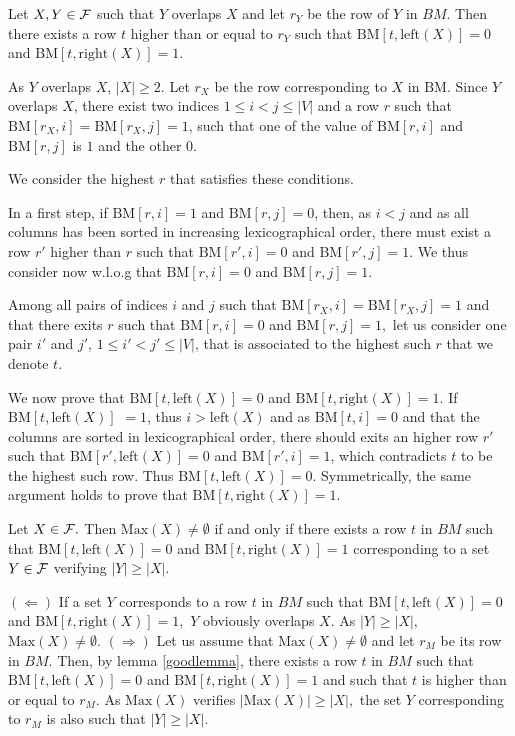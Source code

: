 \documentclass{llncs}
\begin{document}
\begin{lemma}
 Let $X,Y\in {\cal F}$ such that $Y$ overlaps $X$ and let $r_Y$ be the
 row of $Y$ in $BM$. Then there exists a row $t$ higher than or equal
 to $r_Y$ such that $\mbox{BM}[t,\mbox{left}(X)]=0$ and
 $\mbox{BM}[t,\mbox{right}(X)]=1.$
\label{goodlemma}
\end{lemma}
\begin{preuve}
 As $Y$ overlaps $X$, $|X|\geq 2.$ Let $r_X$ be the row
 corresponding to $X$ in $\mbox{BM}.$ Since $Y$ overlaps $X$, there
 exist two indices $1 \leq i < j \leq |V|$ and a row $r$ such that
 $\mbox{BM}[r_X,i]=\mbox{BM}[r_X,j]=1$, such that one of the value of
 $\mbox{BM}[r,i]$ and $\mbox{BM}[r,j]$ is $1$ and the other $0.$

We consider the highest $r$ that satisfies these conditions.

In a first step, if $\mbox{BM}[r,i]=1$ and $\mbox{BM}[r,j]=0$, then, as $i < j$
and as all columns has been sorted in increasing lexicographical
order, there must exist a row $r'$ higher than $r$ such that
$\mbox{BM}[r',i]=0$ and $\mbox{BM}[r',j]=1.$ We thus consider now
w.l.o.g that $\mbox{BM}[r,i]=0$ and $\mbox{BM}[r,j]=1.$

Among all pairs of indices $i$ and $j$ such that
$\mbox{BM}[r_X,i]=\mbox{BM}[r_X,j]=1$ and that there exits $r$ such
that $\mbox{BM}[r,i]=0$ and $\mbox{BM}[r,j]=1,$ let us consider one
pair $i'$ and $j'$, $1 \leq i'<j' \leq |V|$, that is associated to the
highest such $r$ that we denote $t.$

We now prove that $\mbox{BM}[t,\mbox{left}(X)]=0$ and
$\mbox{BM}[t,\mbox{right}(X)]=1.$ If $\mbox{BM}[t,\mbox{left}(X)]$ $=1$,
thus $i>\mbox{left}(X)$ and as $\mbox{BM}[t,i]=0$ and that the columns
are sorted in lexicographical order, there should exits an higher row
$r'$ such that $\mbox{BM}[r',\mbox{left}(X)]=0$ and
$\mbox{BM}[r',i]=1$, which contradicts $t$ to be the
highest such row. Thus $\mbox{BM}[t,\mbox{left}(X)]=0.$ Symmetrically,
the same argument holds to prove that
$\mbox{BM}[t,\mbox{right}(X)]=1.$
\end{preuve}


\begin{lemma}
 Let $X\in {\cal F}.$ Then $\mbox{Max}(X)\not=\emptyset$ if and only if
 there exists a row $t$ in $BM$ such that
 $\mbox{BM}[t,\mbox{left}(X)]=0$ and $\mbox{BM}[t,\mbox{right}(X)]=1$
 corresponding to a set $Y \in {\cal F}$ verifying $|Y| \geq |X|$. 
\label{uplemma}
\end{lemma}
\begin{preuve}
$(\Leftarrow)$ If a set $Y$ corresponds to a row $t$ in $BM$ such
  that $\mbox{BM}[t,\mbox{left}(X)]=0$ and
  $\mbox{BM}[t,\mbox{right}(X)]=1,$ $Y$ obviously overlaps $X$. As
  $|Y| \geq |X|,$ $\mbox{Max}(X)\not=\emptyset.$  $(\Rightarrow)$ Let us
  assume that $\mbox{Max}(X)\not=\emptyset$ and let $r_M$ be its row in
  $BM.$ Then, by lemma \ref{goodlemma}, there exists a row $t$ in $BM$
  such that $\mbox{BM}[t,\mbox{left}(X)]=0$ and
  $\mbox{BM}[t,\mbox{right}(X)]=1$ and such that $t$ is higher than or
  equal to $r_M$. As $\mbox{Max}(X)$ verifies $|\mbox{Max}(X)| \geq
  |X|,$ the set $Y$ corresponding to $r_M$ is also such that $|Y| \geq
  |X|.$
\end{preuve}
\end{document}
